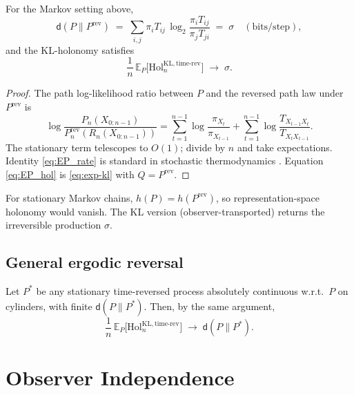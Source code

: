 \documentclass[11pt]{article}
\newcommand{\E}{\mathbb{E}}
\newcommand{\1}{\mathbbm{1}}
\begin{document}
\begin{theorem}\label{thm:EP}
For the Markov setting above,
\begin{equation}\label{eq:EP_rate}
\mathsf{d}(P\|P^{\mathrm{rev}}) \;=\; \sum_{i,j}\pi_i T_{ij}\,\log_2\frac{\pi_i T_{ij}}{\pi_j T_{ji}} \;=\; \sigma\quad(\text{bits/step}),
\end{equation}
and the KL-holonomy satisfies
\begin{equation}\label{eq:EP_hol}
\frac{1}{n}\,\E_P\big[\mathrm{Hol}_{n}^{\mathrm{KL},\mathrm{time\text{-}rev}}\big] \;\to\; \sigma.
\end{equation}
\end{theorem}
\begin{proof}
The path log-likelihood ratio between $P$ and the reversed path law under $P^{\mathrm{rev}}$ is
\[
\log\frac{P_n(X_{0:n-1})}{P_n^{\mathrm{rev}}(R_n(X_{0:n-1}))}
= \sum_{t=1}^{n-1}\log\frac{\pi_{X_t}}{\pi_{X_{t-1}}}
+ \sum_{t=1}^{n-1}\log\frac{T_{X_{t-1}X_t}}{T_{X_t X_{t-1}}}.
\]
The stationary term telescopes to $O(1)$; divide by $n$ and take expectations. Identity \eqref{eq:EP_rate} is standard in stochastic thermodynamics \cite{schnakenberg1976,seifert2012}. Equation \eqref{eq:EP_hol} is \eqref{eq:exp-kl} with $Q=P^{\mathrm{rev}}$.
\end{proof}

\begin{remark}
For stationary Markov chains, $h(P)=h(P^{\mathrm{rev}})$, so representation-space holonomy would vanish. The KL version (observer-transported) returns the irreversible production $\sigma$.
\end{remark}

\subsection{General ergodic reversal}
Let $P^\ast$ be any stationary time-reversed process absolutely continuous w.r.t.\ $P$ on cylinders, with finite $\mathsf{d}(P\|P^\ast)$. Then, by the same argument,
\begin{equation}\label{eq:general_rev}
\frac{1}{n}\,\E_P\big[\mathrm{Hol}_{n}^{\mathrm{KL},\mathrm{time\text{-}rev}}\big] \;\to\; \mathsf{d}(P\|P^\ast).
\end{equation}

\section{Observer Independence}
\end{document}
